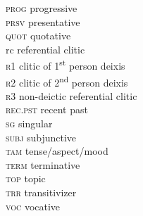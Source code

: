 \documentclass[output=paper]{langsci/langscibook}
\begin{document}
\begin{multicols}{2}
\begin{tabbing}
\textsc{prog} \>   progressive\\
\textsc{prsv} \>   presentative\\
\textsc{quot} \>   quotative\\
rc  \> referential {clitic}\\
\textsc{r1} \>   {clitic} of 1\textsuperscript{st}   person deixis\\
\textsc{r2} \>   {clitic} of 2\textsuperscript{nd}   person deixis\\
\textsc{r3} \>   non-{deictic} referential {clitic}\\
\textsc{rec.pst} \>   recent past\\
\textsc{sg} \>   singular\\
\textsc{subj} \>   {subjunctive}\\
\textsc{tam} \>   {tense}/aspect/mood\\
\textsc{term} \>   terminative\\
\textsc{top} \>   topic\\
\textsc{trr} \>   transitivizer\\
\textsc{voc} \>   vocative \\ 
\end{tabbing}
\end{multicols}
 
{\sloppy
\printbibliography[heading=subbibliography,notkeyword=this]
}
\end{document}

